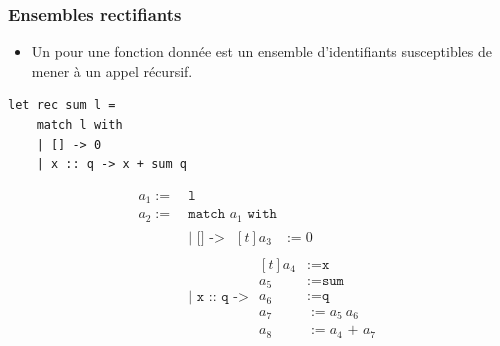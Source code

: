\begin{frame}[fragile,t]
    \frametitle{Ensembles rectifiants}

    \begin{itemize}
        \item Un  pour une fonction donnée est un
              ensemble d'identifiants susceptibles de mener à un appel
              récursif.
    \end{itemize}

    \vspace{0.2cm}

    \pause

    \begin{minipage}[t]{0.5\textwidth}
        \small \begin{verbatim}
let rec sum l =
    match l with
    | [] -> 0
    | x :: q -> x + sum q
        \end{verbatim}

    \end{minipage}%
    \begin{minipage}[t]{0.5\textwidth}
        \vspace{-0.8cm}
        \small \begin{align*}
            a_1 :=\  & \texttt{l}                                          \\
            a_2 :=\  & \texttt{match } a_1 \texttt{ with}                  \\
                     & \texttt{| [] -> } \begin{aligned}[t]
                                             a_3 & := 0
                                         \end{aligned}                 \\
                     & \texttt{| x :: q -> } \begin{aligned}[t]
                                                 a_4 & := \texttt{x}           \\
                                                 a_5 & := \texttt{sum}         \\
                                                 a_6 & := \texttt{q}           \\
                                                 a_7 & := a_5 \ a_6            \\
                                                 a_8 & := a_4 \texttt{ + } a_7
                                             \end{aligned}
        \end{align*}


\end{minipage}
\end{frame}
